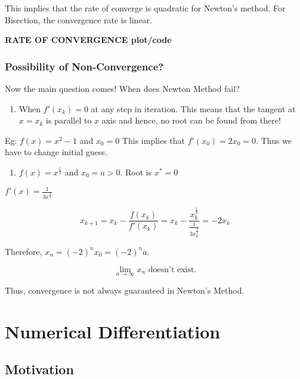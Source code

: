 \documentclass[
]{book}
\providecommand{\tightlist}{%
  \setlength{\itemsep}{0pt}\setlength{\parskip}{0pt}}
\begin{document}
This implies that the rate of converge is quadratic for Newton's method. For Bisection, the convergence rate is linear.

\textbf{RATE OF CONVERGENCE plot/code}

\hypertarget{possibility-of-non-convergence}{%
\subsection{Possibility of Non-Convergence?}\label{possibility-of-non-convergence}}

Now the main question comes! When does Newton Method fail?

\begin{enumerate}
\def\labelenumi{\arabic{enumi}.}
\tightlist
\item
  When \(f'(x_k) = 0\) at any step in iteration. This means that the tangent at \(x=x_k\) is parallel to \(x\) axis and hence, no root can be found from there!
\end{enumerate}

Eg: \(f(x) = x^2-1\) and \(x_0 = 0\) This implies that \(f'(x_0) = 2x_0 = 0\). Thus we have to change initial guess.

\begin{enumerate}
\def\labelenumi{\arabic{enumi}.}
\setcounter{enumi}{1}
\tightlist
\item
  \(f(x) = x^{\frac{1}{3}}\) and \(x_0 = a>0\). Root is \(x^*=0\)
\end{enumerate}

\(f'(x) = \frac{1}{3x^{\frac{2}{3}}}\)

\[x_{k+1}= x_k - \frac{f(x_k)}{f'(x_k)} = x_k - \frac{x_k^{\frac{1}{3}}}{\frac{1}{3x_k^{\frac{2}{3}}}} = -2 x_k\]

Therefore, \(x_n = (-2)^n x_0 = (-2)^n a\).

\[\lim_{n \to \infty} x_n \text{ doesn't exist.}\]

Thus, convergence is not always guaranteed in Newton's Method.

\hypertarget{numerical-differentiation}{%
\chapter{Numerical Differentiation}\label{numerical-differentiation}}

\hypertarget{motivation-3}{%
\section{Motivation}\label{motivation-3}}
\end{document}
